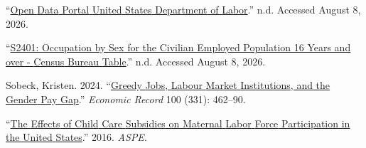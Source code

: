 \documentclass[
  letterpaper,
  DIV=11,
  numbers=noendperiod]{scrartcl}
\newlength{\cslhangindent}
\newenvironment{CSLReferences}[2] %
 {\begin{list}{}{%
  \setlength{\itemindent}{0pt}
  \setlength{\leftmargin}{0pt}
  \setlength{\parsep}{0pt}
  \ifodd #1
   \setlength{\leftmargin}{\cslhangindent}
   \setlength{\itemindent}{-1\cslhangindent}
  \fi
  \setlength{\itemsep}{#2\baselineskip}}}
 {\end{list}}
\begin{document}
\begin{CSLReferences}{1}{0}
{``\href{https://dataportal.dol.gov/datasets/10278}{Open {Data}
{Portal}{\textbar} {United} {States} {Department} of {Labor}}.''} n.d.
Accessed August 8, 2026.

{``\href{https://data.census.gov/table/ACSST5Y2023.S2401}{S2401:
{Occupation} by {Sex} for the Civilian Employed Population 16 Years and
over - {Census} {Bureau} {Table}}.''} n.d. Accessed August 8, 2026.

Sobeck, Kristen. 2024.
{``\href{https://doi.org/10.1111/1475-4932.12824}{Greedy {Jobs},
{Labour} {Market} {Institutions}, and the {Gender} {Pay} {Gap}}.''}
\emph{Economic Record} 100 (331): 462--90.

{``\href{http://aspe.hhs.gov/reports/effects-child-care-subsidies-maternal-labor-force-participation-united-states}{The
{Effects} of {Child} {Care} {Subsidies} on {Maternal} {Labor} {Force}
{Participation} in the {United} {States}}.''} 2016. \emph{ASPE}.

\end{CSLReferences}
\end{document}
